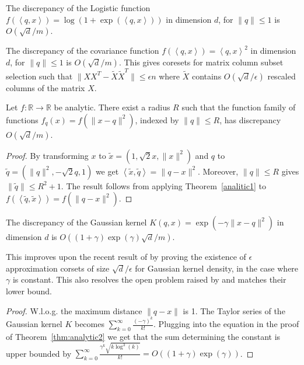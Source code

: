 \documentclass[anon,12pt]{colt2019} %
\newcommand{\ip}[1]{\left \langle #1 \right \rangle}
\newcommand{\R}{\mathbb{R}}
\newcommand{\eps}{\epsilon}
\begin{document}
\begin{corollary}
The discrepancy of the Logistic function $f(\ip{q,x}) = \log(1+\exp(\ip{q,x}))$ in dimension $d$, for $\|q\| \leq 1$ is $O(\sqrt{d}/m)$.
\end{corollary}

\begin{corollary}
The discrepancy of the covariance function $f(\ip{q,x}) = \ip{q,x}^2$ in dimension $d$, for $\|q\| \leq 1$ is $O(\sqrt{d}/m)$. This gives coresets for matrix column subset selection such that $\|XX^T - \tilde X \tilde X^T\| \le \eps n$ where $\tilde X$ contains $O(\sqrt{d}/\eps)$ rescaled columns of the matrix $X$.
\end{corollary}



\begin{theorem} \label{thm:analytic2}
Let $f:\R\rightarrow\R$ be analytic. There exist a radius $R$ such that the function family of functions $f_q(x) = f(\|x-q\|^2)$, indexed by $\|q\| \leq R$, has discrepancy $O(\sqrt{d}/m)$. 
\end{theorem}
\begin{proof}
By transforming $x$ to $\tilde{x} = (1, \sqrt{2}x, \|x\|^2)$ and $q$ to $\tilde{q} = (\|q\|^2, -\sqrt{2}q, 1)$ we get $\ip{\tilde{x},\tilde{q}} = \|q-x\|^2$. Moreover, $\|q\| \le R$ gives $\|\tilde q\| \le R^2+1$. The result follows from applying Theorem~\ref{analitic1} to $f(\ip{ \tilde q, \tilde x}) = f(\|q-x\|^2)$.
\end{proof}

\begin{corollary}
The discrepancy of the Gaussian kernel $K(q,x) = \exp(-\gamma \|x-q\|^2)$ in dimension $d$ is $O((1+\gamma)\exp(\gamma)\sqrt{d}/m)$.
\end{corollary} 
This improves upon the recent result of \cite{DBLP:journals/corr/abs-1802-01751} by proving the existence of $\eps$ approximation corsets of size $\sqrt{d}/\eps$ for Gaussian kernel density, in the case where $\gamma$ is constant. 
This also resolves the open problem raised by \cite{DBLP:journals/corr/abs-1802-01751} and matches their lower bound.   

\begin{proof}
W.l.o.g. the maximum distance $\|q-x\|$ is 1. The Taylor series of the Gaussian kernel $K$ becomes
$ \sum_{k=0}^\infty \frac{(-\gamma)^k}{k!} $.
Plugging into the equation in the proof of Theorem~\ref{thm:analytic2} we get that the sum determining the constant is upper bounded by
$ \sum_{k=0}^\infty \frac{\gamma^{k}\sqrt{ k\log^3(k)}}{k!} = O\left((1+\gamma) \exp(\gamma)\right)$.
\end{proof}
\end{document}
